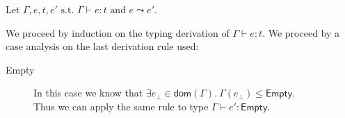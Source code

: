 \documentclass[a4paper]{article}%
\newcommand{\dom}[1]{\textsf{dom}(#1)}
\newcommand{\Empty} {\textsf{Empty}}%
\theoremstyle{definition}
\begin{document}
    Let $\Gamma,e,t,e' \text{ s.t. } \Gamma \vdash e : t \text{ and } e \leadsto e'$.

    We proceed by induction on the typing derivation of $\Gamma \vdash e : t$. We proceed by a case analysis on the last derivation rule used:

    \begin{description}
      \item[Empty] In this case we know that $\exists e_{\bot} \in \dom\Gamma.\ \Gamma(e_{\bot}) \leq \Empty$.\\
      Thus we can apply the same rule to type $\Gamma \vdash e' : \Empty$.
    \end{description}
\end{document}

